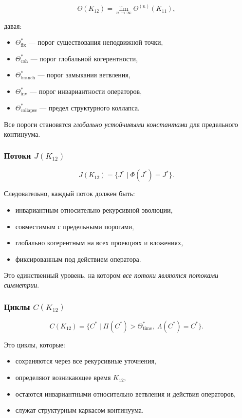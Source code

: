 \[
\Theta(K_{12}) =
\lim_{n\to\infty} \Theta^{(n)}(K_{11}),
\]

давая:
\begin{itemize}
    \item $\Theta^*_{\mathrm{fix}}$ — порог существования неподвижной точки,
    \item $\Theta^*_{\mathrm{coh}}$ — порог глобальной когерентности,
    \item $\Theta^*_{\mathrm{branch}}$ — порог замыкания ветвления,
    \item $\Theta^*_{\mathrm{inv}}$ — порог инвариантности операторов,
    \item $\Theta^*_{\mathrm{collapse}}$ — предел структурного коллапса.
\end{itemize}

Все пороги становятся \emph{глобально устойчивыми константами} для
предельного континуума.

\subsubsection{Потоки $J(K_{12})$}

\[
J(K_{12}) = \{J^*\mid \Phi(J^*)=J^*\}.
\]

Следовательно, каждый поток должен быть:
\begin{itemize}
    \item инвариантным относительно рекурсивной эволюции,
    \item совместимым с предельными порогами,
    \item глобально когерентным на всех проекциях и вложениях,
    \item фиксированным под действием оператора.
\end{itemize}

Это единственный уровень, на котором \emph{все потоки являются потоками
симметрии}.

\subsubsection{Циклы $C(K_{12})$}

\[
C(K_{12}) = \{ C^*\mid \Pi(C^*)>\Theta_{\mathrm{time}}^*,\;
\Lambda(C^*)=C^*\}.
\]

Это циклы, которые:
\begin{itemize}
    \item сохраняются через все рекурсивные уточнения,
    \item определяют возникающее время $K_{12}$,
    \item остаются инвариантными относительно ветвления и действия операторов,
    \item служат структурным каркасом континуума.
\end{itemize}


